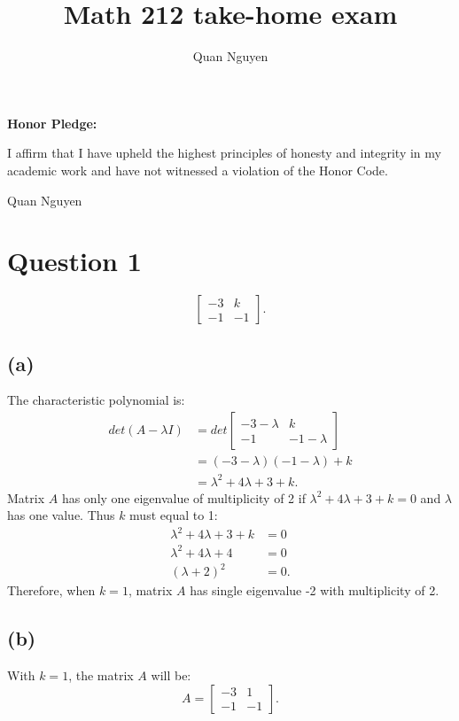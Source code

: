 \documentclass[10pt]{article}
\begin{document}
\title{Math 212 take-home exam}
\author{Quan Nguyen}
\maketitle

\bigskip
\noindent
{\bf Honor Pledge:}
\par
\noindent I affirm that I have upheld the highest principles of honesty and integrity in my academic work and have not witnessed a violation of the Honor Code.
\par
\bigskip
\noindent Quan Nguyen

\bigskip
\noindent

\section*{Question 1}
$$ \begin{bmatrix} -3 & k \\ -1 & -1 \end{bmatrix}. $$
\subsection*{(a)}
\noindent The characteristic polynomial is:
\begin{align*}
    det(A -\lambda I) &= det
    \begin{bmatrix}
        -3-\lambda & k \\
        -1 & -1-\lambda
    \end{bmatrix} \\
    &= (-3-\lambda)(-1-\lambda) + k \\
    &= \lambda^2 + 4\lambda + 3 + k.
\end{align*}
\noindent Matrix $A$ has only one eigenvalue of multiplicity of 2 if $\lambda^2 + 4\lambda + 3 + k = 0$ and $\lambda$ has one value. Thus $k$ must equal to 1:
\begin{align*}
    \lambda^2 + 4\lambda + 3 + k &= 0 \\
    \lambda^2 + 4\lambda + 4 &= 0 \\
    (\lambda + 2)^2 &= 0.
\end{align*}
\noindent Therefore, when $k=1$, matrix $A$ has single eigenvalue -2 with multiplicity of 2.


\subsection*{(b)}
\noindent With $k=1$, the matrix $A$ will be:
\begin{equation*}
    A = \begin{bmatrix}
        -3 & 1 \\
        -1 & -1
    \end{bmatrix}.
\end{equation*}
\end{document}
